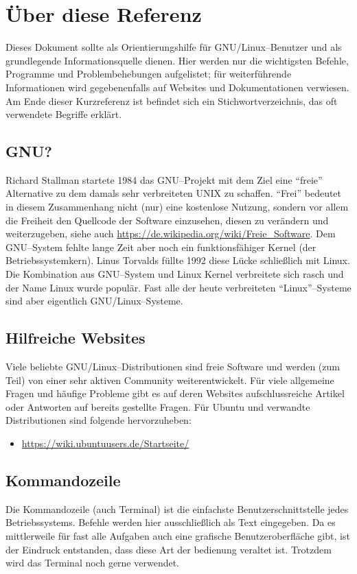 \section {Über diese Referenz}
Dieses Dokument sollte als Orientierungshilfe für GNU/Linux--Benutzer und als grundlegende Informationsquelle dienen. Hier werden nur die wichtigsten Befehle, Programme und Problembehebungen aufgelistet; für weiterführende Informationen wird gegebenenfalls auf Websites und Dokumentationen verwiesen. Am Ende dieser Kurzreferenz ist befindet sich ein Stichwortverzeichnis, das oft verwendete Begriffe erklärt.

\subsection{GNU?}
Richard Stallman startete 1984 das GNU--Projekt mit dem Ziel eine ``freie'' Alternative zu dem damals sehr verbreiteten UNIX zu schaffen. ``Frei'' bedeutet in diesem Zusammenhang nicht (nur) eine kostenlose Nutzung, sondern vor allem die Freiheit den Quellcode der Software einzusehen, diesen zu verändern und weiterzugeben, siehe auch \url{https://de.wikipedia.org/wiki/Freie_Software}. Dem GNU--System fehlte lange Zeit aber noch ein funktionsfähiger Kernel (der Betriebssystemkern). Linus Torvalds füllte 1992 diese Lücke schließlich mit Linux. Die Kombination aus GNU--System und Linux Kernel verbreitete sich rasch und der Name Linux wurde populär. Fast alle der heute verbreiteten ``Linux''--Systeme sind aber eigentlich GNU/Linux--Systeme.

\subsection {Hilfreiche Websites}
Viele beliebte GNU/Linux--Distributionen sind freie Software und werden (zum Teil) von einer sehr aktiven Community weiterentwickelt. Für viele allgemeine Fragen und häufige Probleme gibt es auf deren Websites aufschlussreiche Artikel oder Antworten auf bereits gestellte Fragen. Für Ubuntu und verwandte Distributionen sind folgende hervorzuheben:

\begin{itemize}
	\item \url{https://wiki.ubuntuusers.de/Startseite/}
\end{itemize}

\subsection{Kommandozeile}
Die Kommandozeile (auch Terminal) ist die einfachste Benutzerschnittstelle jedes Betriebssystems. Befehle werden hier ausschließlich als Text eingegeben. Da es mittlerweile für fast alle Aufgaben auch eine grafische Benutzeroberfläche gibt, ist der Eindruck entstanden, dass diese Art der bedienung veraltet ist. Trotzdem wird das Terminal noch gerne verwendet. %

